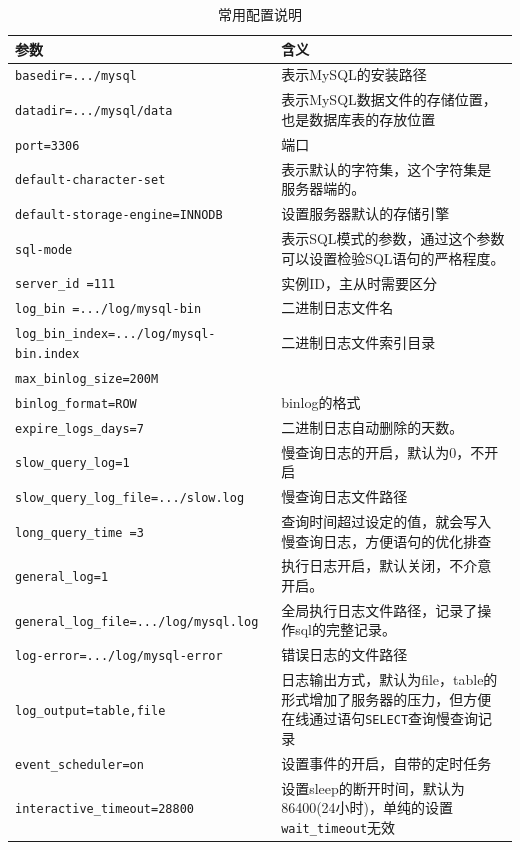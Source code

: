 \documentclass[UTF8,a4paper,12pt]{ctexbook}
\begin{document}
			\begin{table}[H]
				\centering
				\caption{常用配置说明}
				\begin{tabular}{p{8cm}<{\centering}|p{10cm}<{\centering}}
					\toprule
						参数 &  含义 \\
					\midrule
						\verb|basedir=.../mysql  | &  表示MySQL的安装路径 \\
						\verb|datadir=.../mysql/data  | & 表示MySQL数据文件的存储位置，也是数据库表的存放位置 \\
						\verb|port=3306  | & 端口 \\
						\verb|default-character-set |& 表示默认的字符集，这个字符集是服务器端的。\\
						\verb|default-storage-engine=INNODB  | & 设置服务器默认的存储引擎 \\
						\verb|sql-mode |& 表示SQL模式的参数，通过这个参数可以设置检验SQL语句的严格程度。\\
						\verb|server_id =111  | & 实例ID，主从时需要区分 \\
						\verb|log_bin =.../log/mysql-bin  | &  二进制日志文件名\\
						\verb|log_bin_index=.../log/mysql-bin.index  | & 二进制日志文件索引目录 \\
						\verb|max_binlog_size=200M  | &  \\
						\verb|binlog_format=ROW  | & binlog的格式 \\
						\verb|expire_logs_days=7  | &  二进制日志自动删除的天数。 \\
						\verb|slow_query_log=1  | & 慢查询日志的开启，默认为0，不开启 \\
						\verb|slow_query_log_file=.../slow.log  | & 慢查询日志文件路径 \\
						\verb|long_query_time =3  | & 查询时间超过设定的值，就会写入慢查询日志，方便语句的优化排查 \\
						\verb|general_log=1  | &  执行日志开启，默认关闭，不介意开启。\\
						\verb|general_log_file=.../log/mysql.log  | & 全局执行日志文件路径，记录了操作sql的完整记录。 \\
						\verb|log-error=.../log/mysql-error  | &  错误日志的文件路径\\
						\verb|log_output=table,file  | & 日志输出方式，默认为file，table的形式增加了服务器的压力，但方便在线通过语句\verb|SELECT|查询慢查询记录 \\
						\verb|event_scheduler=on  | & 设置事件的开启，自带的定时任务 \\
						\verb|interactive_timeout=28800  | & 设置sleep的断开时间，默认为86400(24小时)，单纯的设置\verb|wait_timeout|无效 \\

\end{tabular}
\end{table}
\end{document}

